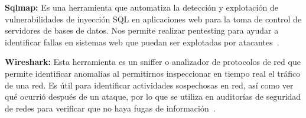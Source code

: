 \begin{itemizeColor}
    \item \textbf{Sqlmap:} Es una herramienta que automatiza la detección y explotación de vulnerabilidades de inyección SQL en aplicaciones web para la toma de control de servidores de bases de datos. Nos permite realizar pentesting para ayudar a identificar fallas en sistemas web que puedan ser explotadas por atacantes~\cite{sqlmap}.
    \item \textbf{Wireshark:} Esta herramienta es un sniffer o analizador de protocolos de red que permite identificar anomalías al permitirnos inspeccionar en tiempo real el tráfico de una red. Es útil para identificar actividades sospechosas en red, así como ver qué ocurrió después de un ataque, por lo que se utiliza en auditorías de seguridad de redes para verificar que no haya fugas de información~\cite{wireshark}.
\end{itemizeColor}
